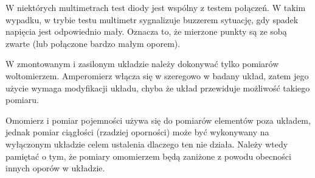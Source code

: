 W niektórych multimetrach test diody jest wspólny z testem połączeń. W takim wypadku, w trybie testu multimetr sygnalizuje
buzzerem sytuację, gdy spadek napięcia jest odpowiednio mały. Oznacza to, że mierzone punkty są ze sobą zwarte
(lub połączone bardzo małym oporem).\\

\begin{ProTip}{}
  W zmontowanym i zasilonym układzie należy dokonywać tylko pomiarów woltomierzem.
  Amperomierz włącza się w szeregowo w badany układ, zatem jego użycie wymaga modyfikacji układu, chyba że układ przewiduje możliwość takiego pomiaru.
  
  Omomierz i pomiar pojemności używa się do pomiarów elementów poza układem,
  jednak pomiar ciągłości (rzadziej oporności) może być wykonywany na wyłączonym układzie celem ustalenia dlaczego ten nie działa.
  Należy wtedy pamiętać o tym, że pomiary omomierzem będą zaniżone z  powodu obecności innych oporów w układzie.
\end{ProTip}
